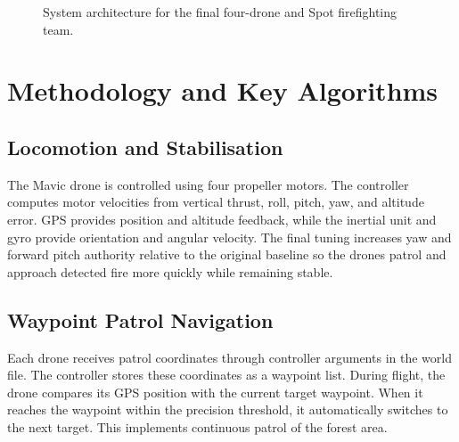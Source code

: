 \documentclass[12pt, a4paper] {report}
\begin{document}
\begin{figure}[H]
{
}
\caption{System architecture for the final four-drone and Spot firefighting team.}
\end{figure}

\vspace{-0.6em}

\section{Methodology and Key Algorithms}
\subsection{Locomotion and Stabilisation}
The Mavic drone is controlled using four propeller motors. The controller computes motor velocities from vertical thrust, roll, pitch, yaw, and altitude error. GPS provides position and altitude feedback, while the inertial unit and gyro provide orientation and angular velocity. The final tuning increases yaw and forward pitch authority relative to the original baseline so the drones patrol and approach detected fire more quickly while remaining stable.

\subsection{Waypoint Patrol Navigation}
Each drone receives patrol coordinates through controller arguments in the world file. The controller stores these coordinates as a waypoint list. During flight, the drone compares its GPS position with the current target waypoint. When it reaches the waypoint within the precision threshold, it automatically switches to the next target. This implements continuous patrol of the forest area.
\end{document}
